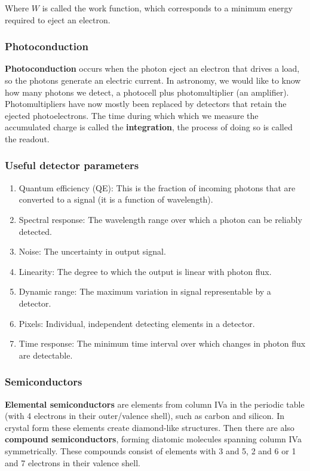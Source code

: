 \documentclass[a4paper]{article}
\begin{document}
Where $W$ is called the work function, which corresponds to a minimum energy required to eject an electron.

\subsubsection*{Photoconduction}

\textbf{Photoconduction} occurs when the photon eject an electron that drives a load, so the photons generate an electric current. In astronomy, we would like to know how many photons we detect, a photocell plus photomultiplier (an amplifier). Photomultipliers have now mostly been replaced by detectors that retain the ejected photoelectrons. The time during which which we measure the accumulated charge is called the \textbf{integration}, the process of doing so is called the readout.

\subsubsection*{Useful detector parameters}

\begin{enumerate}
    \item Quantum efficiency (QE): This is the fraction of incoming photons that are converted to a signal (it is a function of wavelength).
    \item Spectral response: The wavelength range over which a photon can be reliably detected.
    \item Noise: The uncertainty in output signal.
    \item Linearity: The degree to which the output is linear with photon flux. 
    \item Dynamic range: The maximum variation in signal representable by a detector.
    \item Pixels: Individual, independent detecting elements in a detector.
    \item Time response: The minimum time interval over which changes in photon flux are detectable.
\end{enumerate}

\subsubsection{Semiconductors}

\textbf{Elemental semiconductors} are elements from column IVa in the periodic table (with 4 electrons in their outer/valence shell), such as carbon and silicon. In crystal form these elements create diamond-like structures. Then there are also \textbf{compound semiconductors}, forming diatomic molecules spanning column IVa symmetrically. These compounds consist of elements with 3 and 5, 2 and 6 or 1 and 7 electrons in their valence shell.
\end{document}
